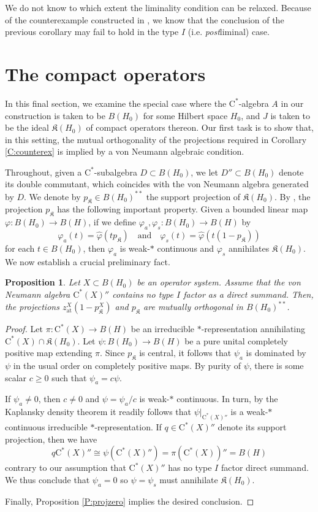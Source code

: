 \documentclass[10pt]{amsart}
\newcommand{\fK}{{\mathfrak{K}}}
\newcommand{\rC}{\mathrm{C}}
\renewcommand{\phi}{\varphi}
\newcommand{\qand}{\quad\text{and}\quad}
\newcommand{\at}{\operatorname{at}}
\newtheorem{proposition}[lemma]{Proposition}
\theoremstyle{definition}
\begin{document}
We do not know to which extent the liminality condition can be relaxed.  Because of the counterexample constructed in \cite{BDO2024}, we know that the conclusion of the previous corollary may fail to hold in the type $I$ (i.e. \emph{post}liminal) case. 



\section{The compact operators}\label{S:compact}

In this final section, we examine the special case where the $\rC^*$-algebra $A$ in our construction is taken to be $B(H_0)$ for some Hilbert space $H_0$, and $J$ is taken to be the ideal $\fK(H_0)$ of compact operators thereon. 
Our first task is to show that, in this setting,  the mutual orthogonality of the projections required in Corollary \ref{C:counterex}  is implied by a von Neumann algebraic condition. 

Throughout, given a $\rC^*$-subalgebra $D\subset B(H_0)$, we let $D''\subset B(H_0)$ denote its double commutant, which coincides with the von Neumann algebra generated by $D$.
We denote by $p_\fK\in B(H_0)^{**}$ the support projection of $\fK(H_0)$. By \cite[Lemma 2.5]{CTh2022}, the projection $p_{\fK}$ has the following important property. Given a bounded linear map $\phi:B(H_0)\to B(H)$, if we define $\phi_a,\phi_s:B(H_0)\to B(H)$ by
\[
\phi_a(t)=\widehat{\phi}(tp_{\fK}) \qand \phi_s(t)=\widehat{\phi}(t(1-p_{\fK}))
\]
for each $t\in B(H_0)$, then $\phi_a$ is weak-$*$ continuous and $\phi_s$ annihilates $\fK(H_0)$. We now establish a crucial preliminary fact.


\begin{proposition}\label{P:projcompact}
Let $X\subset B(H_0)$ be an operator system.  Assume that  the von Neumann algebra $\rC^*(X)''$ contains no type $I$ factor as a direct summand. Then, the projections $z^X_{\at}(1-p_{\fK}^X)$ and $p_{\fK}$ are mutually orthogonal in $B(H_0)^{**}$.
\end{proposition}
\begin{proof}
Let $\pi:\rC^*(X)\to B(H)$ be an irreducible $*$-representation annihilating $\rC^*(X)\cap \fK(H_0)$. Let $\psi:B(H_0)\to B(H)$ be a pure unital completely positive map extending $\pi$. Since $p_{\fK}$ is central, it follows that $\psi_a$ is dominated by $\psi$ in the usual order on completely positive maps. By purity of $\psi$, there is some scalar $c\geq 0$ such that $\psi_a=c\psi$. 

If $\psi_a\neq 0$, then $c\neq 0$ and $\psi=\psi_a/c$ is weak-$*$ continuous. In turn, by the Kaplansky density theorem it readily follows that $\psi|_{\rC^*(X)''}$ is a weak-$*$ continuous irreducible $*$-representation. If $q\in \rC^*(X)''$ denote its support projection, then we have \[ q\rC^*(X)''\cong \psi(\rC^*(X)'')=\pi(\rC^*(X))''=B(H)
\] contrary to our assumption that $\rC^*(X)''$ has no type $I$ factor direct summand. We thus conclude that $\psi_a=0$ so  $\psi=\psi_s$ must annihilate $\fK(H_0)$. 

Finally, Proposition \ref{P:projzero} implies the desired conclusion.
\end{proof}
\end{document}
